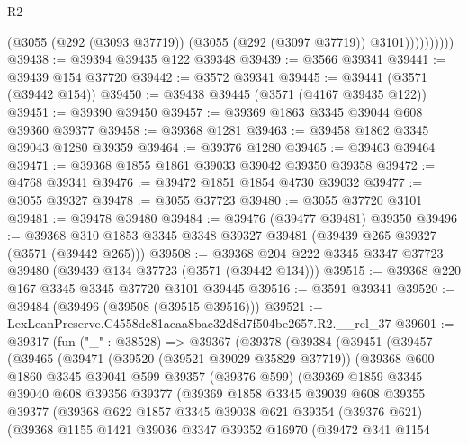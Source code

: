 \begin{lexlean}{R2}
\begin{coremodule}
                    (@3055 (@292 (@3093 @37719)) (@3055 (@292 (@3097 @37719)) @3101))))))))))
@39438 := @39394 @39435 @122 @39348
@39439 := @3566 @39341
@39441 := @39439 @154 @37720
@39442 := @3572 @39341
@39445 := @39441 (@3571 (@39442 @154))
@39450 := @39438 @39445 (@3571 (@4167 @39435 @122))
@39451 := @39390 @39450
@39457 := @39369 @1863 @3345 @39044 @608 @39360 @39377
@39458 := @39368 @1281
@39463 := @39458 @1862 @3345 @39043 @1280 @39359
@39464 := @39376 @1280
@39465 := @39463 @39464
@39471 := @39368 @1855 @1861 @39033 @39042 @39350 @39358
@39472 := @4768 @39341
@39476 := @39472 @1851 @1854 @4730 @39032
@39477 := @3055 @39327
@39478 := @3055 @37723
@39480 := @3055 @37720 @3101
@39481 := @39478 @39480
@39484 := @39476 (@39477 @39481) @39350
@39496 := @39368 @310 @1853 @3345 @3348 @39327 @39481 (@39439 @265 @39327 (@3571 (@39442 @265)))
@39508 := @39368 @204 @222 @3345 @3347 @37723 @39480 (@39439 @134 @37723 (@3571 (@39442 @134)))
@39515 := @39368 @220 @167 @3345 @3345 @37720 @3101 @39445
@39516 := @3591 @39341
@39520 := @39484 (@39496 (@39508 (@39515 @39516)))
@39521 := LexLeanPreserve.C4558dc81acaa8bac32d8d7f504be2657.R2.__rel_37
@39601 := @39317
    (fun ("_" : @38528) =>
    @39367
      (@39378
        (@39384
          (@39451
            (@39457
              (@39465
                (@39471
                  (@39520 (@39521 @39029 @35829 @37719))
                  (@39368
                    @600
                    @1860
                    @3345
                    @39041
                    @599
                    @39357
                    (@39376 @599)
                    (@39369
                      @1859
                      @3345
                      @39040
                      @608
                      @39356
                      @39377
                      (@39369
                        @1858
                        @3345
                        @39039
                        @608
                        @39355
                        @39377
                        (@39368
                          @622
                          @1857
                          @3345
                          @39038
                          @621
                          @39354
                          (@39376 @621)
                          (@39368
                            @1155
                            @1421
                            @39036
                            @3347
                            @39352
                            @16970
                            (@39472
                              @341
                              @1154

\end{coremodule}
\end{lexlean}

